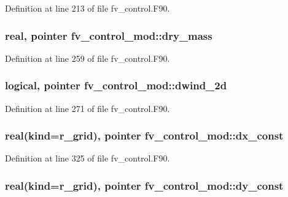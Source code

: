 Definition at line 213 of file fv\-\_\-control.\-F90.

\subsubsection[{dry\-\_\-mass}]{\setlength{\rightskip}{0pt plus 5cm}real, pointer fv\-\_\-control\-\_\-mod\-::dry\-\_\-mass\hspace{0.3cm}{\ttfamily [private]}}\label{classfv__control__mod_ae07ac6dea52be935ced1472909778ccb}


Definition at line 259 of file fv\-\_\-control.\-F90.

\subsubsection[{dwind\-\_\-2d}]{\setlength{\rightskip}{0pt plus 5cm}logical, pointer fv\-\_\-control\-\_\-mod\-::dwind\-\_\-2d\hspace{0.3cm}{\ttfamily [private]}}\label{classfv__control__mod_ac5c21298b6f4836851b6223b2a888906}


Definition at line 271 of file fv\-\_\-control.\-F90.

\subsubsection[{dx\-\_\-const}]{\setlength{\rightskip}{0pt plus 5cm}real(kind=r\-\_\-grid), pointer fv\-\_\-control\-\_\-mod\-::dx\-\_\-const\hspace{0.3cm}{\ttfamily [private]}}\label{classfv__control__mod_a1e8f42debd53f3900228b56386993ef4}


Definition at line 325 of file fv\-\_\-control.\-F90.

\subsubsection[{dy\-\_\-const}]{\setlength{\rightskip}{0pt plus 5cm}real(kind=r\-\_\-grid), pointer fv\-\_\-control\-\_\-mod\-::dy\-\_\-const\hspace{0.3cm}{\ttfamily [private]}}\label{classfv__control__mod_a88f665268580524b485db484cc3b69ff}


